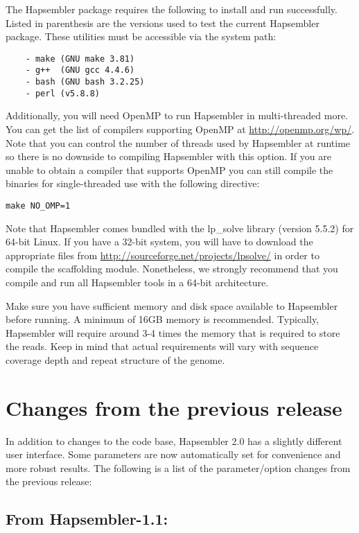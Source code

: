 \documentclass[12pt,a4paper]{report}
\begin{document}
The Hapsembler package requires the following to install and run successfully. Listed in parenthesis are the versions used to test the current Hapsembler package. These utilities must be accessible via the system path:

\begin{verbatim}
    - make (GNU make 3.81)
    - g++  (GNU gcc 4.4.6)
    - bash (GNU bash 3.2.25)
    - perl (v5.8.8)
\end{verbatim}

Additionally, you will need OpenMP to run Hapsembler in multi-threaded more. You can get the list of compilers supporting OpenMP at \url{http://openmp.org/wp/}. Note that you can control the number of threads used by Hapsembler at runtime so there is no downside to compiling Hapsembler with this option. If you are unable to obtain a compiler that supports OpenMP you can still compile the binaries for single-threaded use with the following directive:

\begin{verbatim}
make NO_OMP=1
\end{verbatim}

Note that Hapsembler comes bundled with the lp\_solve library (version 5.5.2) for 64-bit Linux. If you have a 32-bit system, you will have to download the appropriate files from \url{http://sourceforge.net/projects/lpsolve/} in order to compile the scaffolding module. Nonetheless, we strongly recommend that you compile and run all Hapsembler tools in a 64-bit architecture.

Make sure you have sufficient memory and disk space available to Hapsembler before running. A minimum of 16GB memory is recommended. Typically, Hapsembler will require around 3-4 times the memory that is required to store the reads. Keep in mind that actual requirements will vary with sequence coverage depth and repeat structure of the genome.

\section{Changes from the previous release}

In addition to changes to the code base, Hapsembler 2.0 has a slightly different user interface. Some parameters are now automatically set for convenience and more robust results. The following is a list of the parameter/option changes from the previous release:

\subsection{From Hapsembler-1.1:}
\end{document}
